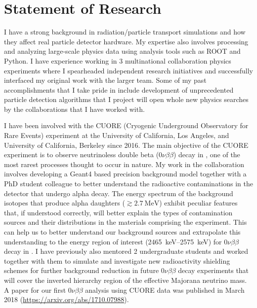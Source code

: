 \documentclass[11pt]{article} %
\begin{document}
\nocite{*} %
%



\clearpage
\section{Statement of Research}

I have a strong background in radiation/particle transport simulations and how
they affect real particle detector hardware. My expertise also involves
processing and analyzing large-scale physics data using analysis tools such as
ROOT and Python. I have experience working in 3 multinational collaboration
physics experiments where I spearheaded independent research initiatives and
successfully interfaced my original work with the larger team. Some of my past
accomplishments that I take pride in include development of unprecedented
particle detection algorithms that I project will open whole new physics
searches by the collaborations that I have worked with.

I have been involved with the CUORE (Cryogenic Underground Observatory for Rare
Events) experiment at the University of California, Los Angeles, and University
of California, Berkeley since 2016. The main objective of the CUORE experiment
is to observe neutrinoless double beta ($0\nu\beta\beta$) decay in
, one of the most rarest processes thought to occur in nature. My
work in the collaboration involves developing a Geant4 based precision
background model together with a PhD student colleague to better understand the
radioactive contaminations in the detector that undergo alpha decay. The
energy spectrum of the background isotopes that produce alpha daughters
($\gtrsim \SI{2.7}{\mega\electronvolt}$) exhibit peculiar features that, if
understood correctly, will better explain the types of contamination sources
and their distributions in the materials comprising the experiment. This can
help us to better understand our background sources and extrapolate this
understanding to the energy region of interest
(\SIrange{2465}{2575}{\kilo\electronvolt}) for $0\nu\beta\beta$ decay in
. I have previously also mentored 2 undergraduate students and
worked together with them to simulate and investigate new radioactivity
shielding schemes for further background reduction in future $0\nu\beta\beta$
decay experiments that will cover the inverted hierarchy region of the
effective Majorana neutrino mass. A paper for our first $0\nu\beta\beta$
analysis using CUORE data was published in March 2018
(\href{https://arxiv.org/abs/1710.07988}{https://arxiv.org/abs/1710.07988}).
\end{document}
